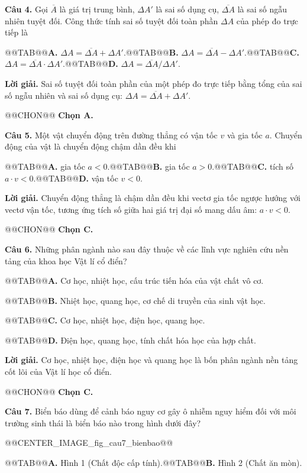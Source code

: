\documentclass{article}
\begin{document}
\textbf{Câu 4.} Gọi $\overline{A}$ là giá trị trung bình, $\Delta A'$ là sai số dụng cụ, $\overline{\Delta A}$ là sai số ngẫu nhiên tuyệt đối. Công thức tính sai số tuyệt đối toàn phần $\Delta A$ của phép đo trực tiếp là

@@TAB@@\textbf{A.} $\Delta A = \overline{\Delta A} + \Delta A'$.@@TAB@@\textbf{B.} $\Delta A = \overline{\Delta A} - \Delta A'$.@@TAB@@\textbf{C.} $\Delta A = \overline{\Delta A} \cdot \Delta A'$.@@TAB@@\textbf{D.} $\Delta A = \overline{\Delta A} / \Delta A'$.

\textbf{Lời giải.} Sai số tuyệt đối toàn phần của một phép đo trực tiếp bằng tổng của sai số ngẫu nhiên và sai số dụng cụ: $\Delta A = \overline{\Delta A} + \Delta A'$.

@@CHON@@ \textbf{Chọn A.}

\textbf{Câu 5.} Một vật chuyển động trên đường thẳng có vận tốc $v$ và gia tốc $a$. Chuyển động của vật là chuyển động chậm dần đều khi

@@TAB@@\textbf{A.} gia tốc $a < 0$.@@TAB@@\textbf{B.} gia tốc $a > 0$.@@TAB@@\textbf{C.} tích số $a \cdot v < 0$.@@TAB@@\textbf{D.} vận tốc $v < 0$.

\textbf{Lời giải.} Chuyển động thẳng là chậm dần đều khi vectơ gia tốc ngược hướng với vectơ vận tốc, tương ứng tích số giữa hai giá trị đại số mang dấu âm: $a \cdot v < 0$.

@@CHON@@ \textbf{Chọn C.}

\textbf{Câu 6.} Những phân ngành nào sau đây thuộc về các lĩnh vực nghiên cứu nền tảng của khoa học Vật lí cổ điển?

@@TAB@@\textbf{A.} Cơ học, nhiệt học, cấu trúc tiến hóa của vật chất vô cơ.

@@TAB@@\textbf{B.} Nhiệt học, quang học, cơ chế di truyền của sinh vật học.

@@TAB@@\textbf{C.} Cơ học, nhiệt học, điện học, quang học.

@@TAB@@\textbf{D.} Điện học, quang học, tính chất hóa học của hợp chất.

\textbf{Lời giải.} Cơ học, nhiệt học, điện học và quang học là bốn phân ngành nền tảng cốt lõi của Vật lí học cổ điển.

@@CHON@@ \textbf{Chọn C.}

\textbf{Câu 7.} Biển báo dùng để cảnh báo nguy cơ gây ô nhiễm nguy hiểm đối với môi trường sinh thái là biển báo nào trong hình dưới đây?

@@CENTER_IMAGE_fig_cau7_bienbao@@

@@TAB@@\textbf{A.} Hình 1 (Chất độc cấp tính).@@TAB@@\textbf{B.} Hình 2 (Chất ăn mòn).
\end{document}
